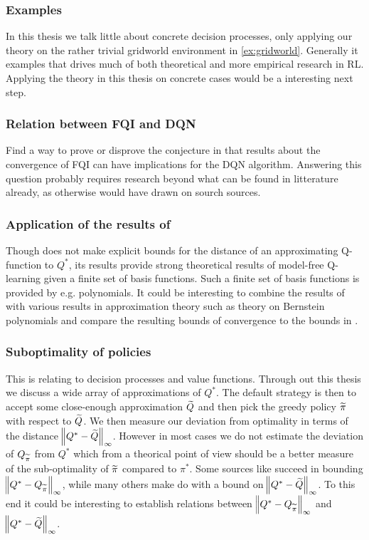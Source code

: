 \subsubsection{Examples}
In this thesis we talk little about concrete decision processes, only
applying our theory on the rather trivial gridworld environment in
\cref{ex:gridworld}.
Generally it examples that drives much of both theoretical and more empirical
research in RL.
Applying the theory in this thesis on concrete cases would be a interesting
next step.

\subsubsection{Relation between FQI and DQN}
Find a way to prove or disprove the conjecture in  that
results about the convergence of FQI can have implications for the 
DQN algorithm.
Answering this question probably requires research beyond what can be
found in litterature already, as otherwise  would have
drawn on sourch sources.

\subsubsection{Application of the results of }
Though  does not make explicit bounds for the distance of an approximating
Q-function to $Q^*$,
its results provide strong theoretical results
of model-free Q-learning given a finite set of basis functions. 
Such a finite set of basis functions is provided by e.g.
polynomials. It could be interesting to combine the results of 
with various results in approximation theory such as theory on Bernstein
polynomials and compare the resulting bounds of convergence to the bounds in
.

\subsubsection{Suboptimality of policies}
This is relating to decision processes and value functions.
Through out this thesis we discuss a wide array of
approximations of $Q^*$.
The default strategy is then to accept some close-enough approximation $\widetilde{Q}$
and then pick the greedy policy $\widetilde{\pi}$ with respect to $\widetilde{Q}$.
We then measure our deviation from optimality in terms of the distance
$\norm{Q^* - \widetilde{Q}}_\infty$.
However in most cases we do not estimate the deviation of
$Q_{\widetilde{\pi}}$ from $Q^*$ which from a theorical point of view should be
a better measure of the sub-optimality of $\widetilde{\pi}$ compared to $\pi^*$.
Some sources like  succeed in bounding
$\norm{Q^* - Q_{\widetilde{\pi}}}_\infty$,
while many others make do with a bound on $\norm{Q^* - \widetilde{Q}}_\infty$.
To this end it could be interesting to establish relations
between $\norm{Q^* - Q_{\widetilde{\pi}}}_\infty$ and $\norm{Q^* - \widetilde{Q}}_\infty$.

